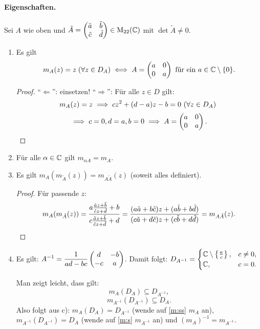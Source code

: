 \documentclass[a4paper,twoside,DIV15,BCOR12mm]{scrbook}
\begin{document}
\paragraph{Eigenschaften.} Sei $A$ wie oben und $\tilde{A} = \left(\!\!\!\begin{array}{c c}\tilde{a}&\tilde{b}\\\tilde{c}&\tilde{d}\end{array}\!\!\!\right) \in
\mathrm{M}_{22}(\mathbb{C})$ mit $\det \tilde{A} \neq 0$.
\begin{enumerate}
\item Es gilt
  \[m_A(z) = z \; (\forall z \in D_A) \iff A = \left(\!\!\!\begin{array}{c c}a&0\\0&a\end{array}\!\!\!\right) \text { für ein } a \in \mathbb{C} \setminus \{0\}.\]
  \begin{proof}
    "`$\Leftarrow$"': einsetzen! "`$\Rightarrow$"': Für alle $z\in D$ gilt:
    \[m_A(z)=z \implies cz^2 + (d-a)z - b = 0 \text{ (}\forall z\in D_A\text{) }\]
    \[\implies c=0, d=a, b=0 \implies A = \left(\!\!\!\begin{array}{c c}a&0\\0&a\end{array}\!\!\!\right). \qedhere\]
  \end{proof}
\item Für alle $\alpha\in\mathbb{C}$ gilt $m_{\alpha A} = m_A$.
\item Es gilt $m_A(m_{\tilde{A}}(z)) = m_{A\tilde{A}}(z)$ (soweit alles definiert).
\begin{proof} Für passende $z$:
  \[m_A(m_{\tilde{A}}(z)) =
  \frac{a\frac{\tilde{a}z+\tilde{b}}{\tilde{c}z+\tilde{d}}+b}{c\frac{\tilde{a}z+\tilde{b}}{\tilde{c}z+\tilde{d}}+d} =
  \frac{(a\tilde{a}+b\tilde{c})z+(a\tilde{b}+b\tilde{d})}{(c\tilde{a}+d\tilde{c})z+(c\tilde{b}+d\tilde{d})} =
  m_{A\tilde{A}}(z). \qedhere\]
\end{proof}
\item Es gilt: $\displaystyle A^{-1} = \frac{1}{ad-bc}\left(\!\!\!\begin{array}{c c}d&-b\\-c&a\end{array}\!\!\!\right)$. Damit folgt: $\displaystyle D_{A^{-1}}=
  \begin{cases} \mathbb{C}\setminus\left\{\frac{a}{c}\right\},&c\neq 0,\\\mathbb{C},&c=0.\end{cases}$

Man zeigt leicht, dass gilt:
\[\label{m:s}m_A(D_A) \subseteq D_{A^{-1}},\tag{$\ast$}\]
\[\label{m:ss}m_{A^{-1}}(D_{A^{-1}}) \subseteq D_A.\tag{$\ast\ast$}\]
Also folgt aus c): $m_A(D_A) = D_{A^{-1}}$ (wende auf \eqref{m:ss} $m_A$ an), $m_{A^{-1}}(D_{A^{-1}}) = D_A$ (wende auf \eqref{m:s} $m_{A^{-1}}$ an) und $(m_A)^{-1} = m_{A^{-1}}$.


\end{enumerate}
\end{document}
